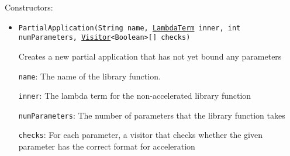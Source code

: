 Constructors:
\begin{itemize}
\item \texttt{PartialApplication(String name, \hyperref[type:edu.kit.wavelength.client.model.term.LambdaTerm]{LambdaTerm} inner, int numParameters, \hyperref[type:edu.kit.wavelength.client.model.term.Visitor]{Visitor}<Boolean>[] checks)}

Creates a new partial application that has not yet bound any parameters

\texttt{name}: The name of the library function.

\texttt{inner}: The lambda term for the non-accelerated library function

\texttt{numParameters}: The number of parameters that the library function takes

\texttt{checks}: For each parameter, a visitor that checks whether the given parameter
 has the correct format for acceleration

\end{itemize}

